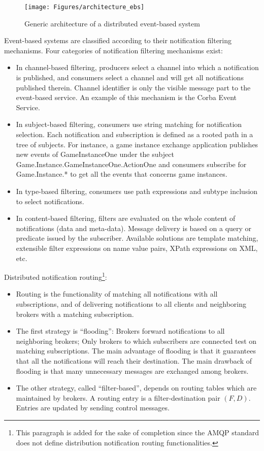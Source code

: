 \begin{figure}[htbp!]
\begin{center}
\texttt{[image: Figures/architecture\_ebs]}
\caption{Generic architecture of a distributed event-based system}
\label{F_architecture_ebs}
\end{center}
\end{figure}

Event-based systems are classified according to their notification
filtering mechanisms. Four categories of notification filtering
mechanisms exist:
\begin{itemize}
\item In channel-based filtering, producers select a channel into
  which a notification is published, and consumers select a channel
  and will get all notifications published therein. Channel identifier
  is only the visible message part to the event-based service. An
  example of this mechanism is the Corba Event Service.
\item In subject-based filtering, consumers use string matching for
  notification selection. Each notification and subscription is
  defined as a rooted path in a tree of subjects. For instance, a game
  instance exchange application publishes new events of
  \textsf{GameInstanceOne} under the subject
  \textsf{Game.Instance.GameInstanceOne.ActionOne} and consumers
  subscribe for \textsf{Game.Instance.*} to get all the
  events that concerns game instances.
\item In type-based filtering, consumers use path expressions and
  subtype inclusion to select notifications.
\item In content-based filtering, filters are evaluated on the whole
  content of notifications (data and meta-data). Message delivery is
  based on a query or predicate issued by the subscriber. Available
  solutions are template matching, extensible filter expressions on
  name value pairs, XPath expressions on XML, etc.
\end{itemize}

\noindent Distributed notification routing\footnote{This paragraph is added
  for the sake of completion since the AMQP standard does not define distribution
  notification routing functionalities.}:
\begin{itemize}
\item Routing is the functionality of matching all notifications with
  all subscriptions, and of delivering notifications to all clients
  and neighboring brokers with a matching subscription.
\item The first strategy is ``flooding'': Brokers forward
  notifications to all neighboring brokers; Only brokers to which
  subscribers are connected test on matching subscriptions. The main
  advantage of flooding is that it guarantees that all the
  notifications will reach their destination. The main drawback of
  flooding is that many unnecessary messages are exchanged among
  brokers.
\item The other strategy, called ``filter-based'', depends on routing
  tables which are maintained by brokers. A routing entry is a
  filter-destination pair $(F, D)$. Entries are updated by sending
  control messages.
\end{itemize}


